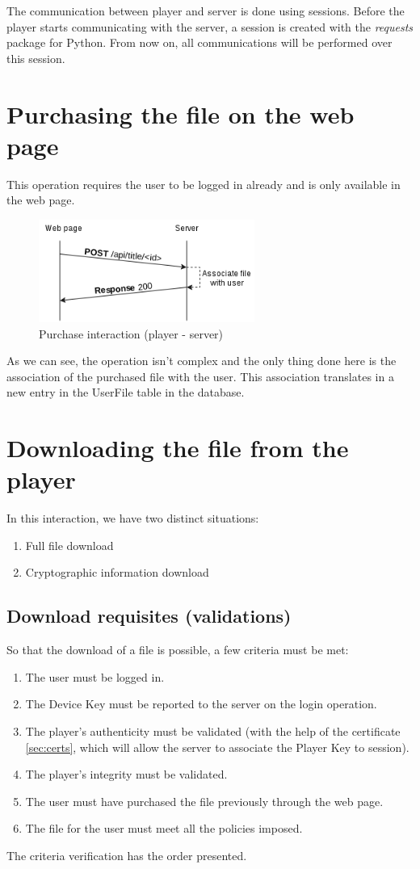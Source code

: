 \documentclass[11pt,a4paper]{report}
\begin{document}
The communication between player and server is done using sessions. Before the player starts communicating with the server, a session is created with the \emph{requests} package for Python.
From now on, all communications will be performed over this session.

\section{Purchasing the file on the web page}
This operation requires the user to be logged in already and is only available in the web page.

\begin{figure}[H]
\centerline{\includegraphics[width=200pt]{images/buyTitle.png}}
\caption{Purchase interaction (player - server)}
\label{player}
\end{figure}

As we can see, the operation isn't complex and the only thing done here is the association of the purchased file with the user.
This association translates in a new entry in the UserFile table in the database.

\section{Downloading the file from the player}
In this interaction, we have two distinct situations:
\begin{enumerate}
  \item Full file download
  \item Cryptographic information download
\end{enumerate}

\subsection{Download requisites (validations)}
\label{sec:requ}
So that the download of a file is possible, a few criteria must be met:
\begin{enumerate}
\item The user must be logged in.
\item The Device Key must be reported to the server on the login operation.
\item The player's authenticity must be validated (with the help of the certificate \autoref{sec:certs}, which will allow the server to associate the Player Key to session).
\item The player's integrity must be validated.
\item The user must have purchased the file previously through the web page.
\item The file for the user must meet all the policies imposed.
\end{enumerate}
The criteria verification has the order presented.
\end{document}
